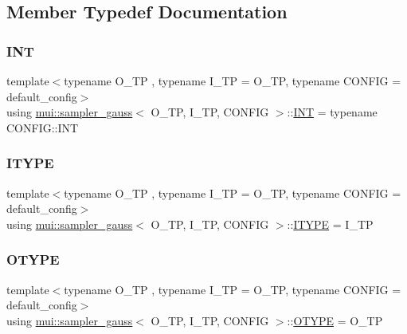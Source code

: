 \subsection{Member Typedef Documentation}
\mbox{\label{classmui_1_1sampler__gauss_ad0e59c03d0d57ebc420c9d99a9c05bfa}} 
\subsubsection{\texorpdfstring{I\+NT}{INT}}
{\footnotesize\ttfamily template$<$typename O\+\_\+\+TP , typename I\+\_\+\+TP  = O\+\_\+\+TP, typename C\+O\+N\+F\+IG  = default\+\_\+config$>$ \\
using \hyperlink{classmui_1_1sampler__gauss}{mui\+::sampler\+\_\+gauss}$<$ O\+\_\+\+TP, I\+\_\+\+TP, C\+O\+N\+F\+IG $>$\+::\hyperlink{classmui_1_1sampler__gauss_ad0e59c03d0d57ebc420c9d99a9c05bfa}{I\+NT} =  typename C\+O\+N\+F\+I\+G\+::\+I\+NT}

\mbox{\label{classmui_1_1sampler__gauss_a3d12840af96d1e49b37ca6ceec0005e6}} 
\subsubsection{\texorpdfstring{I\+T\+Y\+PE}{ITYPE}}
{\footnotesize\ttfamily template$<$typename O\+\_\+\+TP , typename I\+\_\+\+TP  = O\+\_\+\+TP, typename C\+O\+N\+F\+IG  = default\+\_\+config$>$ \\
using \hyperlink{classmui_1_1sampler__gauss}{mui\+::sampler\+\_\+gauss}$<$ O\+\_\+\+TP, I\+\_\+\+TP, C\+O\+N\+F\+IG $>$\+::\hyperlink{classmui_1_1sampler__gauss_a3d12840af96d1e49b37ca6ceec0005e6}{I\+T\+Y\+PE} =  I\+\_\+\+TP}

\mbox{\label{classmui_1_1sampler__gauss_a315bd10f3854b5411bcb50c6250736e8}} 
\subsubsection{\texorpdfstring{O\+T\+Y\+PE}{OTYPE}}
{\footnotesize\ttfamily template$<$typename O\+\_\+\+TP , typename I\+\_\+\+TP  = O\+\_\+\+TP, typename C\+O\+N\+F\+IG  = default\+\_\+config$>$ \\
using \hyperlink{classmui_1_1sampler__gauss}{mui\+::sampler\+\_\+gauss}$<$ O\+\_\+\+TP, I\+\_\+\+TP, C\+O\+N\+F\+IG $>$\+::\hyperlink{classmui_1_1sampler__gauss_a315bd10f3854b5411bcb50c6250736e8}{O\+T\+Y\+PE} =  O\+\_\+\+TP}

